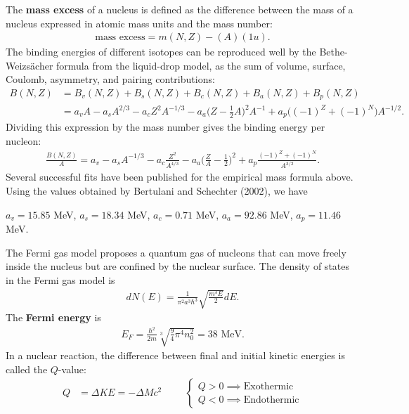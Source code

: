 The \textbf{mass excess} of a nucleus is defined as the difference between the mass of a nucleus expressed in atomic mass units and the mass number:
\begin{align}
\textrm{mass excess}=m(N,Z)-(A)(1 u).
\end{align} 
The binding energies of different isotopes can be reproduced well by the Bethe-Weizs\"{a}cher formula from the liquid-drop model, as the sum of volume, surface, Coulomb, asymmetry, and pairing contributions:
\begin{align}
B(N,Z)&=B_v(N,Z)+B_s(N,Z)+B_c(N,Z)+B_a(N,Z)+B_p(N,Z) \\
&=a_vA-a_sA^{2/3}-a_cZ^2A^{-1/3}-a_a\bigg(Z-\frac{1}{2}A \bigg)^2A^{-1}+a_p\big((-1)^Z+(-1)^N \big)A^{-1/2}.
\end{align}
Dividing this expression by the mass number gives the binding energy per nucleon:
\begin{align}
\frac{B(N,Z)}{A}=a_v-a_sA^{-1/3}-a_c\frac{Z^2}{A^{4/3}}-a_a\bigg(\frac{Z}{A}-\frac{1}{2} \bigg)^2+a_p\frac{(-1)^Z+(-1)^N}{A^{3/2}}.
\end{align}
Several successful fits have been published for the empirical mass formula above. Using the values obtained by Bertulani and Schechter (2002), we have
\begin{center}
	$a_v=15.85$ MeV, $a_s=18.34$ MeV, $a_c=0.71$ MeV, $a_a=92.86$ MeV, $a_p=11.46$ MeV. 
\end{center}
The Fermi gas model proposes a quantum gas of nucleons that can move freely inside the nucleus but are confined by the nuclear surface. The density of states in the Fermi gas model is 
\begin{align}
dN(E)=\frac{1}{\pi^2 a^3\hbar^3}\sqrt{\frac{m^3E}{2}}dE.
\end{align}
The \textbf{Fermi energy} is
\begin{align}
E_F=\frac{\hbar^2}{2m}\sqrt[3]{\frac{9}{4}\pi^4n_0^2}=38 \textrm{ MeV}.
\end{align}
In a nuclear reaction, the difference between final and initial
kinetic energies is called the $Q$-value:
\begin{align}
Q&=\Delta KE=-\Delta Mc^2 \hspace{1cm}
\begin{cases}
Q>0 \implies \textrm{Exothermic} \\
Q<0 \implies \textrm{Endothermic}
\end{cases}
\end{align}







